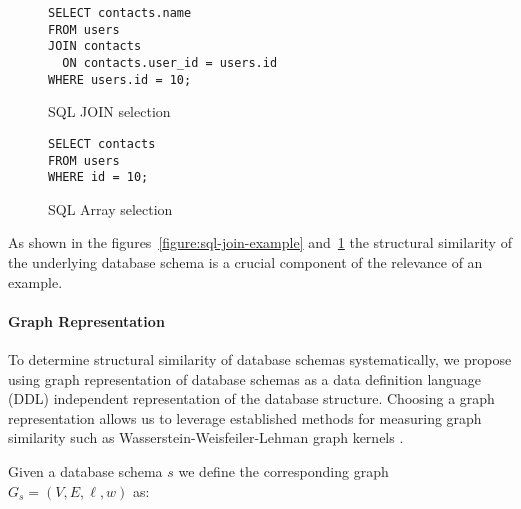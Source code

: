\begin{figure}[ht]
  \vspace{1em}
  \hfill
  \begin{minipage}[b]{0.45\linewidth}
    \begin{verbatim}
SELECT contacts.name
FROM users
JOIN contacts
  ON contacts.user_id = users.id
WHERE users.id = 10;
    \end{verbatim}
    \caption{SQL JOIN selection}
    \label{figure:sql-join-example}
  \end{minipage}
  \hfill
  \begin{minipage}[b]{0.35\linewidth}
    \centering
    \begin{verbatim}
SELECT contacts
FROM users
WHERE id = 10;
    \end{verbatim}
    \vspace{1.3em}
    \caption{SQL Array selection}
    \label{figure:sql-array-example}
  \end{minipage}
  \hfill
  \vspace{1em}
\end{figure}


As shown in the figures~\ref{figure:sql-join-example} and~\ref{figure:sql-array-example}
the structural similarity of the underlying database schema is a crucial component
of the relevance of an example.

\paragraph{Graph Representation}

To determine structural similarity of database schemas systematically, we propose
using graph representation of database schemas as a data definition language (DDL)
independent representation of the database structure. Choosing a graph
representation allows us to leverage established methods for measuring graph similarity
such as Wasserstein-Weisfeiler-Lehman graph kernels \citep{WWL}. %

Given a database schema $s$ we define the corresponding graph $G_s = (V, E, \ell, w)$ as:

